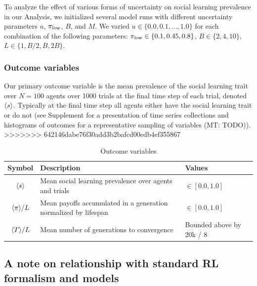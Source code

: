 \documentclass[letterpaper,11.5pt]{scrartcl}
\newcommand{\mt}[1]{{\textcolor{myorange} {({\tiny MT:} #1)}}}
\begin{document}
To analyze the effect of various forms of uncertainty on social learning 
prevalence in our Analysis, we initialized several model runs with
different uncertainty parameters $u$, $\pi_{\mathrm{\mathrm{low}}}$, $B$,
and $M$. We varied $u \in \{0.0, 0.1, \ldots, 1.0\}$ for each combination of
the following parameters:
$\pi_{\mathrm{low}} \in \{0.1, 0.45, 0.8\}$, $B \in \{2, 4, 10\}$, $L \in \{1, B/2, B, 2B\}$.

\subsubsection{Outcome variables}

Our primary outcome variable is the mean prevalence of the social learning
trait over $N=100$ agents over 1000 trials at the final time step of each trial,
denoted $\langle s \rangle$.
Typically at the final time step all agents either have the social learning
trait or do not (see Supplement for a presentation of time series collections
and histograms of outcomes for
a representative sampling of variables \mt{TODO}).
>>>>>>> 642146dabe76f30add3b2bafcd00edb4ef355867

\begin{table}[h]
    \caption{Outcome variables}
    \label{tab:outcomeVariables}
    \centering %
    \begin{tabular}{cp{2.5in}p{1in}} \toprule

        Symbol & Description & Values \\ 

        \midrule  

        $\langle s \rangle$ & Mean social learning prevalence over agents and trials
                  & $\in [0.0, 1.0]$ \\

        $\langle \pi \rangle / L$ & Mean payoffs accumulated in a generation normalized by
        lifespan & $\in [0.0, 1.0]$ \\

        $\langle T \rangle / L$ & Mean number of generations to convergence & Bounded above by 20k / 8\\
        \bottomrule
    \end{tabular}
\end{table}


\subsection{A note on relationship with standard RL formalism and models}
\end{document}
